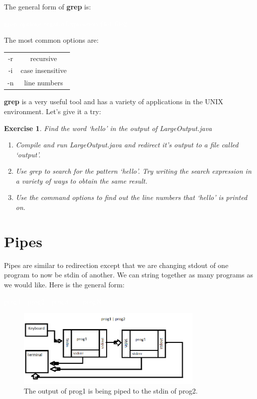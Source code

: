 \documentclass[oneside]{book}
\newcommand{\commandline}[1]{\begin{center} \colorbox{Dark}{\textcolor{white}{#1}} \end{center}}
\newtheorem{ex}{Exercise}[chapter]
\begin{document}
The general form of \textbf{grep} is:
    \commandline{grep options regularExpression file1 file2 ...}
    \vspace{0.15cm}
        The most common options are:
    \begin{center}
    \begin{tabular}{|c|c|}
        \hline
        -r & recursive \\
        -i & case insensitive \\
        -n & line numbers \\ 
        \hline
    \end{tabular}
    \end{center}
    \vspace{0.15cm}
    
    \textbf{grep} is a very useful tool and has a variety of applications in the UNIX environment. Let's give it a try:
    
    \vspace{0.3cm}
    \begin{ex} Find the word `hello' in the output of LargeOutput.java
        \begin{enumerate}
            \item Compile and run LargeOutput.java and redirect it's output to a file called `output'.
            \item Use grep to search for the pattern `hello'. Try writing the search expression in a variety of ways to obtain the same result.
            \item Use the command options to find out the line numbers that `hello' is printed on.
        \end{enumerate}
    \end{ex}
    
\section{Pipes}
Pipes are similar to redirection except that we are changing stdout of one program to now be stdin of another. We can string together as many programs as we would like. Here is the general form:
\commandline{prog1 $|$ prog2 $|$ prog3 ... $|$ progN}
\vspace{0.15cm}

    \begin{figure}[H]
    	\centering
    	\label{tab:directory_tree}
    	\includegraphics[width=90mm]{pipe_example.png}
    	\caption{The output of prog1 is being piped to the stdin of prog2.}
    \end{figure}
\end{document}
